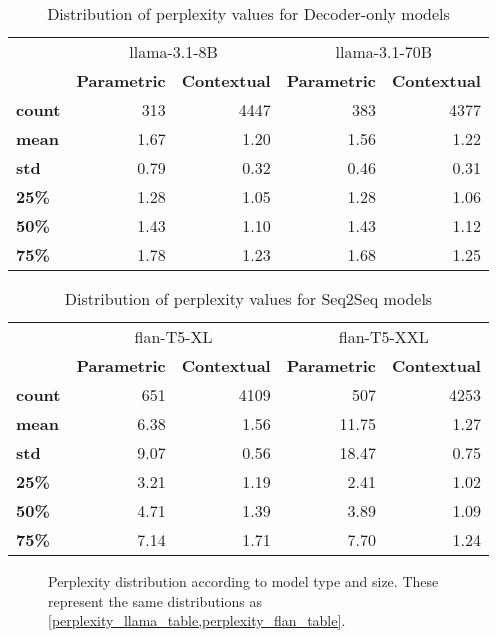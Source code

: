\begin{table}[h]
	\centering
	\footnotesize
	\begin{tabular}{>{\bfseries}l | r r | r r}
		\toprule
			& \multicolumn{2}{|c}{\ttfamily llama-3.1-8B} & \multicolumn{2}{|c}{\ttfamily llama-3.1-70B} \\
			& \bfseries Parametric & \bfseries Contextual & \bfseries Parametric & \bfseries Contextual \\
		\midrule
			count &  313 & 4447 &  383 & 4377  \\
			mean  & 1.67 & 1.20 & 1.56 & 1.22  \\
			std   & 0.79 & 0.32 & 0.46 & 0.31  \\
			25\%  & 1.28 & 1.05 & 1.28 & 1.06  \\
			50\%  & 1.43 & 1.10 & 1.43 & 1.12  \\
			75\%  & 1.78 & 1.23 & 1.68 & 1.25  \\
		\bottomrule
	\end{tabular}
	\caption{Distribution of perplexity values for Decoder-only models}
	\label{perplexity_llama_table}
\end{table}

\begin{table}[h]
	\centering
	\footnotesize
	\begin{tabular}{>{\bfseries}l | r r | r r}
		\toprule
			& \multicolumn{2}{|c}{\ttfamily flan-T5-XL} & \multicolumn{2}{|c}{\ttfamily flan-T5-XXL} \\
			& \bfseries Parametric & \bfseries Contextual & \bfseries Parametric & \bfseries Contextual \\
		\midrule
			count &  651 & 4109 &   507 & 4253 \\
			mean  & 6.38 & 1.56 & 11.75 & 1.27 \\
			std   & 9.07 & 0.56 & 18.47 & 0.75 \\
			25\%  & 3.21 & 1.19 &  2.41 & 1.02 \\
			50\%  & 4.71 & 1.39 &  3.89 & 1.09 \\
			75\%  & 7.14 & 1.71 &  7.70 & 1.24 \\
		\bottomrule
	\end{tabular}
	\caption{Distribution of perplexity values for Seq2Seq models}
	\label{perplexity_flan_table}
\end{table}

\begin{figure}[H]
	\centering
	\caption{Perplexity distribution according to model type and size. These represent the same distributions as \cref{perplexity_llama_table,perplexity_flan_table}.}
	\label{perplexity_results}
\end{figure}

